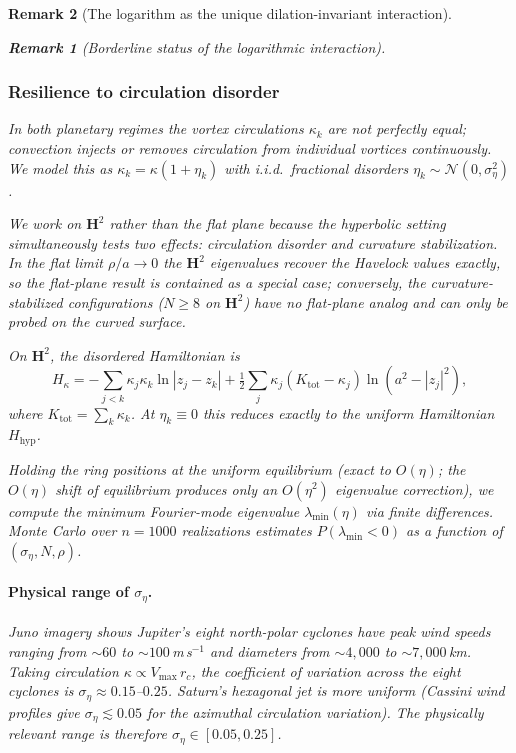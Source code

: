 \documentclass[12pt, a4paper]{article}
\newtheorem{remark}{Remark}[section]
\numberwithin{equation}{section}
\begin{document}
\begin{remark}[The logarithm as the unique dilation-invariant interaction]
\begin{remark}[Borderline status of the logarithmic interaction]
\subsubsection{Resilience to circulation disorder}
\label{sec:disorder}

In both planetary regimes the vortex circulations $\kappa_k$ are not
perfectly equal; convection injects or removes circulation from individual
vortices continuously.  We model this as $\kappa_k = \kappa(1+\eta_k)$
with i.i.d.\ fractional disorders $\eta_k \sim \mathcal{N}(0,\sigma_\eta^2)$.

We work on $\mathbf{H}^2$ rather than the flat plane because the
hyperbolic setting simultaneously tests two effects: circulation
disorder and curvature stabilization.  In the flat limit
$\rho/a \to 0$ the $\mathbf{H}^2$ eigenvalues recover the Havelock
values exactly, so the flat-plane result is contained as a special
case; conversely, the curvature-stabilized configurations ($N \ge 8$
on $\mathbf{H}^2$) have no flat-plane analog and can only be probed
on the curved surface.

On $\mathbf{H}^2$, the disordered Hamiltonian is
\begin{equation}\label{eq:H_kappa}
  H_\kappa = -\sum_{j<k}\kappa_j\kappa_k\ln|z_j - z_k|
  + \tfrac12\sum_j\kappa_j(K_{\mathrm{tot}}-\kappa_j)\ln(a^2 - |z_j|^2),
\end{equation}
where $K_{\mathrm{tot}} = \sum_k\kappa_k$.  At $\eta_k \equiv 0$ this
reduces exactly to the uniform Hamiltonian $H_{\mathrm{hyp}}$.

Holding the ring positions at the uniform equilibrium (exact to $O(\eta)$;
the $O(\eta)$ shift of equilibrium produces only an $O(\eta^2)$ eigenvalue
correction), we compute the minimum Fourier-mode eigenvalue
$\lambda_{\min}(\eta)$ via finite differences.  Monte Carlo over
$n = 1000$ realizations estimates $P(\lambda_{\min} < 0)$ as a function
of $(\sigma_\eta, N, \rho)$.

\paragraph{Physical range of $\sigma_\eta$.}
Juno imagery \citep{Adriani2018,Gavriel2021} shows Jupiter's eight
north-polar cyclones have peak wind speeds ranging from
$\sim\!60$ to $\sim\!100$\,m\,s$^{-1}$ and diameters from
$\sim\!4{,}000$ to $\sim\!7{,}000$\,km.  Taking circulation
$\kappa \propto V_{\max}\,r_c$, the coefficient of variation across
the eight cyclones is $\sigma_\eta \approx 0.15$--$0.25$.  Saturn's
hexagonal jet is more uniform (Cassini wind profiles give
$\sigma_\eta \lesssim 0.05$ for the azimuthal circulation variation).
The physically relevant range is therefore
$\sigma_\eta \in [0.05, 0.25]$.


\end{remark}
\end{remark}
\end{document}
